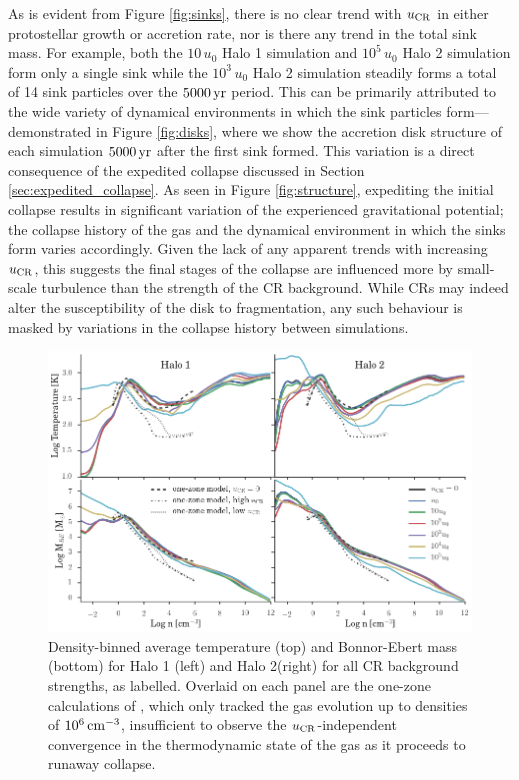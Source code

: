 \documentclass[usenatbib]{mn2e}
\newcommand{\cc}{\,{\rm cm}^{-3}}
\newcommand{\yr}{\,{\rm yr}}
\newcommand{\ucr}{{u}_{\rm \small CR}}
\begin{document}
As is evident from Figure \ref{fig:sinks}, there is no clear trend with $\ucr$ in either protostellar growth or accretion rate, nor is there any trend in the total sink mass.
For example, both the $10\,u_0$ Halo 1 simulation and $10^5\,u_0$ Halo 2 simulation form only a single sink while the $10^3\,u_0$ Halo 2 simulation steadily forms a total of 14 sink particles over the $5000\yr$ period.
This  can be primarily attributed to the wide variety of dynamical environments in which the sink particles form---demonstrated in Figure \ref{fig:disks}, where we show the accretion disk structure of each simulation $5000\yr$ after the first sink formed.
This variation is a direct consequence of the expedited collapse discussed in Section \ref{sec:expedited_collapse}. 
As seen in Figure \ref{fig:structure}, expediting the initial collapse results in significant variation of the experienced gravitational potential; the collapse history of the gas and the dynamical environment in which the sinks form varies accordingly.
Given the lack of any apparent trends with increasing $\ucr$, this suggests the final stages of the collapse are influenced more by small-scale turbulence than the strength of the CR background.
While CRs may indeed alter the susceptibility of the disk to fragmentation, any such behaviour is masked by variations in the collapse history between simulations.

\begin{figure}
\begin{center}
\includegraphics[width=1\textwidth]{figures/binned_T_Mbe/binned_T_Mbe}
\caption{\label{fig:Mbe}
Density-binned average temperature (top) and Bonnor-Ebert mass (bottom) for Halo 1 (left) and Halo 2(right) for all CR background strengths, as labelled.
Overlaid on each panel are the one-zone calculations of \citet{StacyBromm2007}, which only tracked the gas evolution up to densities of $10^6\cc$, insufficient to observe the $\ucr$-independent convergence in the thermodynamic state of the gas as it proceeds to runaway collapse.%
}
\end{center}
\end{figure}
\end{document}
